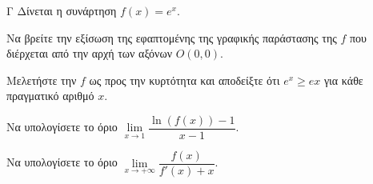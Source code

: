 \begin{thema}{Γ}
Δίνεται η συνάρτηση $f(x) = e^x$.
\begin{erwthma}
  \item Να βρείτε την εξίσωση της εφαπτομένης της γραφικής παράστασης της $f$ που διέρχεται από την αρχή των αξόνων $O(0,0)$.
  \item Μελετήστε την $f$ ως προς την κυρτότητα και αποδείξτε ότι $e^x \ge ex$ για κάθε πραγματικό αριθμό $x$.
  \item Να υπολογίσετε το όριο $\lim\limits_{x \to 1} \dfrac{\ln(f(x)) - 1}{x - 1}$.
  \item Να υπολογίσετε το όριο $\lim\limits_{x \to +\infty} \dfrac{f(x)}{f'(x) + x}$.
\end{erwthma}
\end{thema}
